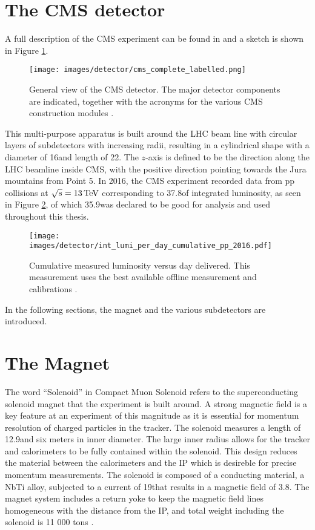 \section{The CMS detector}
\noindent\justify
A full description of the CMS experiment can be found in \cite{Chatrchyan:2008aa} and a sketch is shown in Figure \ref{fig:CMS}.
\begin{figure}[!htp]
  \centering
   \texttt{[image: images/detector/cms\_complete\_labelled.png]}
   \caption{General view of the CMS detector. The major detector components are indicated, together with the acronyms for the various CMS construction modules \cite{Chatrchyan:2009hb}.}
   \label{fig:CMS}
\end{figure}                                                                                                                                                                                    
This multi-purpose apparatus is built around the LHC beam line with circular layers of subdetectors with increasing radii, resulting in a cylindrical shape with a diameter of 16\m and length of 22\m.
The $z$-axis is defined to be the direction along the LHC beamline inside CMS, with the positive direction pointing towards the Jura mountains from Point 5.  
In 2016, the CMS experiment recorded data from pp collisions at $\sqrt{s}=13\,\text{Te\hspace{-.08em}V}$ corresponding to 37.8\fbinv of integrated luminosity, as seen in Figure \ref{fig:lumi}, of which 35.9\fbinv was declared to be good for analysis and used throughout this thesis. 
\begin{figure}[!htp]
  \centering
   \texttt{[image: images/detector/int\_lumi\_per\_day\_cumulative\_pp\_2016.pdf]}
   \caption{Cumulative measured luminosity versus day delivered. This measurement uses the best available offline measurement and calibrations \cite{lumi}.}
   \label{fig:lumi}
\end{figure}                                                                               
In the following sections, the magnet and the various subdetectors are introduced. 
\section{The Magnet}
\noindent\justify
The word ``Solenoid'' in Compact Muon Solenoid refers to the superconducting solenoid magnet that the experiment is built around. 
A strong magnetic field is a key feature at an experiment of this magnitude as it is essential for momentum resolution of charged particles in the tracker. 
The solenoid measures a length of 12.9\m and six meters in inner diameter. 
The large inner radius allows for the tracker and calorimeters to be fully contained within the solenoid. 
This design reduces the material between the calorimeters and the IP which is desireble for precise momentum measurements. 
The solenoid is composed of a conducting material, a NbTi alloy, subjected to a current of 19\kA that results in a magnetic field of 3.8\T. 
The magnet system includes a return yoke to keep the magnetic field lines homogeneous with the distance from the IP, and total weight including the solenoid is 11 000 tons \cite{CERN-LHCC-97-010}.
